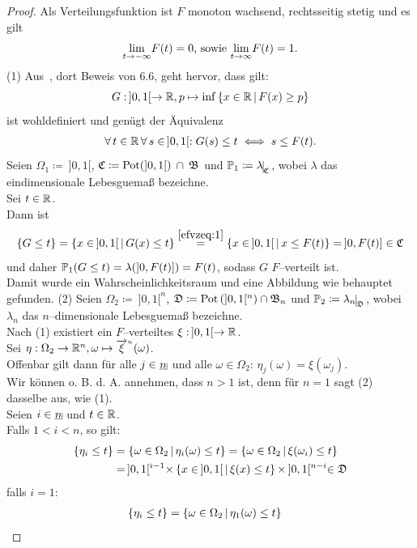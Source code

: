 \begin{proof}
Als Verteilungsfunktion ist 
$F$ monoton wachsend, rechtsseitig stetig und es gilt
\[\underset{t\to -\infty}{\lim}F(t) = 0\text{, sowie }\underset{t\to \infty}{\lim} F(t) = 1\text.\]
(1) Aus~\cite{Irle}, dort Beweis von 6.6, geht hervor, dass gilt:
\[G:\!\  ]0,1[ \rightarrow \mathbb{R}, p \mapsto \inf\left\{x \in \mathbb{R}\,|\,F(x) \ge p\right\}\]
ist wohldefiniert und genügt der Äquivalenz
\begin{align}
\forall\,t\in\mathbb{R}\,\forall\,s\in\!\ ]0,1[:
G(s)\le t\iff s\le F(t)\text.\label{efvzeq:1}
\end{align}
Seien $\Omega_1\coloneqq \!\ ]0,1[$, $\mathfrak{C} \coloneqq  \mathop{\textrm{Pot}}\nolimits(]0,1[)\: \cap\: \mathfrak{B}$ und
$\Prim_1\coloneqq \restrict{\lambda}{\mfc}$, wobei $\lambda$ das eindimensionale Lebesguemaß
bezeichne.\\
Sei $t \in \mathbb{R}$.\\
Dann ist
\[\left\{G \le t\right\} = \left\{x \in\!\  ]0,1[\,|\,G(x) \le t\right\}
\overset{\eqref{efvzeq:1}}= 
\left\{x \in\!\  ]0,1[\,|\,x \le F(t)\right\} = \!\ ]0, F(t)] \in \mathfrak{C}\]
und daher $\mathbb{P}_1(G \le t) = \lambda (]0, F(t)]) = F(t)$, sodass
$G$ $F$--verteilt ist.\\
Damit wurde ein Wahrscheinlichkeitsraum und eine Abbildung wie behauptet
gefunden.\absatz
(2) Seien $\Omega_2\coloneqq \!\ ]0,1[^n$, $\mathfrak{D}\coloneqq \mathop{\textrm{Pot}}\nolimits\left(]0,1[^n\right) \cap \mathfrak{B}_n$
und $\Prim_2\coloneqq  \restrict{\lambda_n}{\mfd}$, wobei $\lambda_n$ das $n$--dimensionale
Lebesguemaß bezeichne.\\
Nach (1) existiert ein $F$--verteiltes $\xi:\!\ ]0,1[\rightarrow\mathbb{R}$.\\
Sei $\eta: \Omega_2 \rightarrow \mathbb{R}^n, \omega \mapsto {\overrightarrow{\xi}}^{{}_n} (\omega)$.\\
Offenbar gilt dann für alle $j \in \haken n$ und alle $\omega \in \Omega_2$:
$\eta_j(\omega) = \xi(\omega_j)$.\\
Wir können o. B. d. A. annehmen, dass $n > 1$ ist, denn für $n = 1$ sagt (2)
dasselbe aus, wie (1).\\
Seien $i \in \haken n$ und $t \in \mathbb{R}$.\\
Falls $1<i<n$, so gilt:
\begin{align*}
\meng{\eta_i \le t} & = \menge{\omega \in \Omega_2}{\eta_i(\omega) \le t}
 = \menge{\omega \in \Omega_2}{\xi(\omega_i) \le t}\\
 &=\!\  ]0,1[^{i-1}\times\menge{x \in\!\  ]0, 1[}{\xi(x)\le t}\times\!\ 
 ]0,1[^{n-i}
 \in \mfd
\end{align*}
falls $i = 1$:
\begin{align*}
\meng{\eta_i \le t} & = \menge{\omega \in \Omega_2}{\eta_1(\omega) \le t}

\end{align*}
\end{proof}
